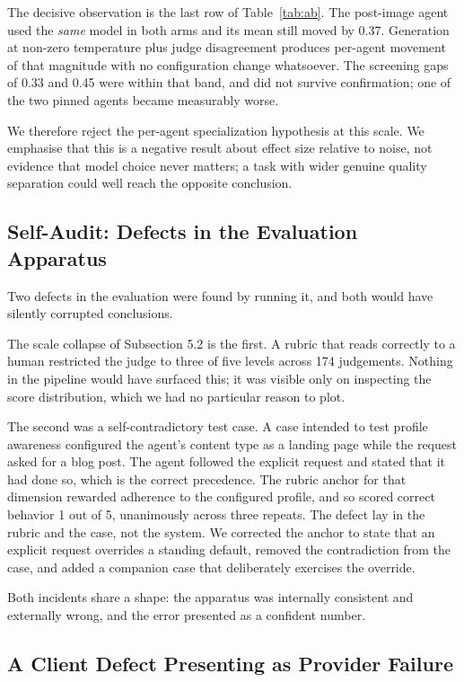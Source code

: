 \documentclass[9pt,twocolumn]{extarticle}
\newcommand{\tabref}[1]{Table~\ref{#1}}
\begin{document}
The decisive observation is the last row of \tabref{tab:ab}. The post-image
agent used the \textit{same} model in both arms and its mean still moved by
0.37. Generation at non-zero temperature plus judge disagreement produces
per-agent movement of that magnitude with no configuration change whatsoever.
The screening gaps of 0.33 and 0.45 were within that band, and did not survive
confirmation; one of the two pinned agents became measurably worse.

We therefore reject the per-agent specialization hypothesis at this scale. We
emphasise that this is a negative result about effect size relative to noise,
not evidence that model choice never matters; a task with wider genuine quality
separation could well reach the opposite conclusion.

\subsection{Self-Audit: Defects in the Evaluation Apparatus}

Two defects in the evaluation were found by running it, and both would have
silently corrupted conclusions.

The scale collapse of Subsection 5.2 is the first. A rubric that reads
correctly to a human restricted the judge to three of five levels across 174
judgements. Nothing in the pipeline would have surfaced this; it was visible
only on inspecting the score distribution, which we had no particular reason to
plot.

The second was a self-contradictory test case. A case intended to test profile
awareness configured the agent's content type as a landing page while the
request asked for a blog post. The agent followed the explicit request and
stated that it had done so, which is the correct precedence. The rubric anchor
for that dimension rewarded adherence to the configured profile, and so scored
correct behavior 1 out of 5, unanimously across three repeats. The defect lay
in the rubric and the case, not the system. We corrected the anchor to state
that an explicit request overrides a standing default, removed the
contradiction from the case, and added a companion case that deliberately
exercises the override.

Both incidents share a shape: the apparatus was internally consistent and
externally wrong, and the error presented as a confident number.

\subsection{A Client Defect Presenting as Provider Failure}
\end{document}
